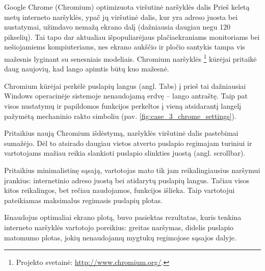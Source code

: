 \begin{xcase}{Google Chrome (Chromium) optimizuota viršutinė naršyklės dalis}
  \xcgoal
  {
  	Prieš keletą metų interneto naršyklės, ypač jų viršutinė dalis, kur yra adreso
	juosta bei nustatymai, užimdavo nemažą ekrano dalį (dažniausia daugiau negu 120 pikselių).
	Tai tapo dar aktualiau išpopuliarėjaus 
	plačiaekraniams monitoriams bei nešiojamiems kompiuteriams, nes ekrano aukščio ir pločio
	santykis tampa vis mažesnis lyginant su senesniais modeliais. Chromium naršyklės
	\footnote{Projekto svetainė: \url{http://www.chromium.org/}.} kūrėjai pritaikė 
	daug naujovių, kad lango apimtis būtų kuo mažesnė.
  }
  
  \xctools
  {
    Chromium kūrėjai perkėlė puslapių langus (angl. Tabs) į prieš tai dažniausiai 
    Windows operacinėje sistemoje nenaudojamą erdvę – lango antraštę.
    Taip pat visos nustatymų ir papildomos funkcijos perkeltos į vieną atsidarantį
    langelį pažymėtą mechaninio rakto simboliu (pav. \ref{fig:case_3_chrome_settings}).
	
    {
    }
  }
  
  \xcresult
  {
  	Pritaikius naują Chromium išdėstymą, naršyklės viršutinė dalis pastebimai sumažėjo.
    Dėl to atsirado daugiau vietos atverto puslapio regimajam turiniui ir vartotojams 
    mažiau reikia slankioti puslapio slinkties juostą (angl. scrollbar).
  }
  
  \xcprinciples
  {
    {
      Pritaikius minimalistinę sąsają, vartotojas mato tik jam reikalingiausius 
      naršymui įrankius: internetinio adreso juostą bei atidarytų puslapių
      langus. Tačiau visos kitos reikalingos, bet rečiau naudojamos, funkcijos
      išlieka. Taip vartotojui pateikiamas maksimalus regimasis puslapių 
      plotas.
    }
  }
  
  \xcthoughts
  {
    Išnaudojus optimaliai ekrano plotą, buvo pasiektas rezultatas, kuris tenkina
    interneto naršyklės vartotojo poreikius: greitas naršymas, didelis puslapio
    matomumo plotas, jokių nenaudojamų mygtukų regimojose sąsajos dalyje.
  }
\end{xcase}
